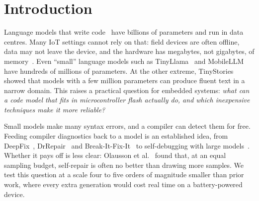 \section{Introduction}
Language models that write code~\cite{chen2021codex,li2022alphacode,austin2021mbpp} have billions of parameters and run in data centres. Many IoT settings cannot rely on that: field devices are often offline, data may not leave the device, and the hardware has megabytes, not gigabytes, of memory~\cite{warden2019tinyml,david2021tflm,lin2020mcunet}. Even ``small'' language models such as TinyLlama~\cite{zhang2024tinyllama} and MobileLLM~\cite{liu2024mobilellm} have hundreds of millions of parameters. At the other extreme, TinyStories~\cite{eldan2023tinystories} showed that models with a few million parameters can produce fluent text in a narrow domain. This raises a practical question for embedded systems: \emph{what can a code model that fits in microcontroller flash actually do, and which inexpensive techniques make it more reliable?}

Small models make many syntax errors, and a compiler can detect them for free. Feeding compiler diagnostics back to a model is an established idea, from DeepFix~\cite{gupta2017deepfix}, DrRepair~\cite{yasunaga2020drrepair} and Break-It-Fix-It~\cite{yasunaga2021bifi} to self-debugging with large models~\cite{chen2024selfdebug,madaan2023selfrefine,shinn2023reflexion}. Whether it pays off is less clear: Olausson et al.~\cite{olausson2024selfrepair} found that, at an equal sampling budget, self-repair is often no better than drawing more samples. We test this question at a scale four to five orders of magnitude smaller than prior work, where every extra generation would cost real time on a battery-powered device.

